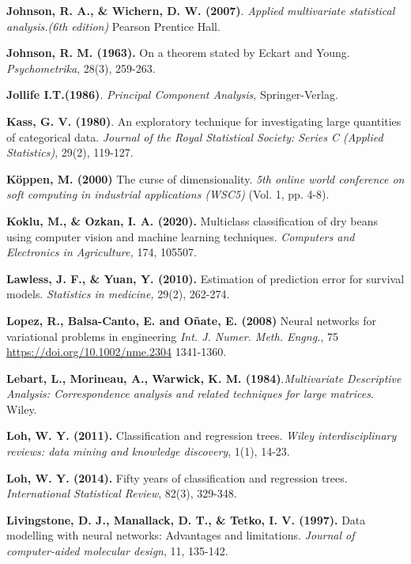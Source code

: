 \begin{thebibliography}{99}
\textbf{Johnson, R. A., \& Wichern, D. W. (2007)}. \emph{Applied multivariate statistical analysis.(6th edition)} Pearson Prentice Hall.

 \textbf{Johnson, R. M. (1963).} On a theorem stated by Eckart and Young. \emph{Psychometrika}, 28(3), 259-263.

 \textbf{Jollife I.T.(1986)}. \emph{Principal Component Analysis}, Springer-Verlag.



\textbf{Kass, G. V. (1980)}. An exploratory technique for investigating large quantities of categorical data. \emph{Journal of the Royal Statistical Society: Series C (Applied Statistics)}, 29(2), 119-127.

 \textbf{Köppen, M. (2000)} The curse of dimensionality. \textit{5th online world conference on soft computing in industrial applications (WSC5)}  (Vol. 1, pp. 4-8).

\textbf{Koklu, M., \& Ozkan, I. A. (2020).} Multiclass classification of dry beans using computer vision and machine learning techniques. \emph{Computers and Electronics in Agriculture,} 174, 105507.

 \textbf{Lawless, J. F., \& Yuan, Y. (2010).} Estimation of prediction error for survival models. \emph{Statistics in medicine,} 29(2), 262-274.

 \textbf{Lopez, R., Balsa-Canto, E. and Oñate, E. (2008)}  Neural networks for variational problems in engineering \emph{Int. J. Numer. Meth. Engng.}, 75\\ \url{https://doi.org/10.1002/nme.2304} 1341-1360. 

\textbf{Lebart, L., Morineau, A.,  Warwick, K. M. (1984)}.\textit{Multivariate Descriptive Analysis: Correspondence analysis and related techniques for large matrices}. Wiley.

\textbf{Loh, W. Y. (2011).} Classification and regression trees.\emph{ Wiley interdisciplinary reviews: data mining and knowledge discovery}, 1(1), 14-23.

\textbf{Loh, W. Y. (2014).} Fifty years of classification and regression trees. \emph{International Statistical Review}, 82(3), 329-348.

\textbf{Livingstone, D. J., Manallack, D. T., \& Tetko, I. V. (1997).} Data modelling with neural networks: Advantages and limitations. \emph{Journal of computer-aided molecular design}, 11, 135-142.


\end{thebibliography}
